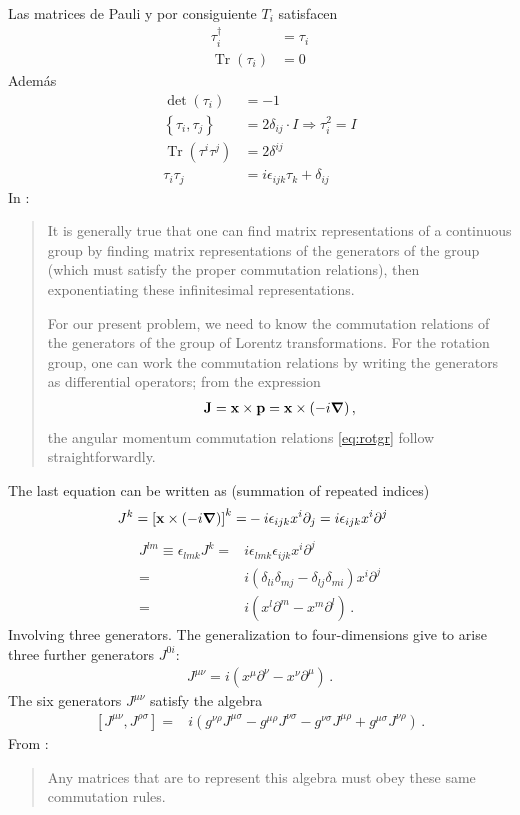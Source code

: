 Las matrices de Pauli y por consiguiente $T_i$ satisfacen 
\begin{align}
  \tau_i^\dagger&=\tau_i\nonumber\\
  \operatorname{Tr}  \left(
    \tau_i
  \right)&=0
\end{align}
Además
\begin{align}
  \label{eq:64qft}
  \det
  \left(
    \tau_i
  \right)&=-1\nonumber\\
  \left\{ 
    \tau_i,\tau_j
  \right\}&=2\delta_{ij}\cdot I\Rightarrow\tau_i^2=I\nonumber \\
\operatorname{Tr} \left(\tau^i\tau^j\right)&=2\delta^{ij}\nonumber\\
\tau_i\tau_j&=i\epsilon_{ijk}\tau_k+\delta_{ij}
\end{align}
In \cite{Peskin}:
\begin{quote}
  It is generally true that one can find matrix representations of a continuous group by finding matrix representations of the generators of the group (which must satisfy the proper commutation relations), then exponentiating these infinitesimal representations. 

For our present problem, we need to know the commutation relations of the generators of the group of Lorentz transformations. For the rotation group, one can work the commutation relations by writing the generators as differential operators; from the expression
\begin{align}
  \mathbf{J}=\mathbf{x}\times \mathbf{p}=\mathbf{x}\times (-i\boldsymbol{\nabla})\,,
\end{align}
the angular momentum commutation relations \eqref{eq:rotgr} follow straightforwardly. 
\end{quote}
The last equation can be written as (summation of repeated indices)
\begin{align}
  J^k=\left[\mathbf{x}\times (-i\boldsymbol{\nabla})\right]^k=&
-i\epsilon_{ijk}x^i\partial_j=i\epsilon_{ijk}x^i\partial^j
\end{align}
\begin{align}
  J^{l m}\equiv\epsilon_{lmk}J^k=&i\epsilon_{lmk}\epsilon_{ijk}x^i\partial^j\nonumber\\
=&i(\delta_{li}\delta_{mj}-\delta_{lj}\delta_{mi})x^i\partial^j\nonumber\\
=&i(x^l\partial^m-x^m\partial^l)\,.
\end{align}
Involving three generators. The generalization to four-dimensions give to arise three further generators $J^{0i}$:
\begin{align}
  J^{\mu\nu}=i(x^\mu\partial^\nu-x^\nu\partial^\mu)\,.
\end{align}
The six generators $J^{\mu\nu}$ satisfy the algebra
\begin{align}
\label{eq:lrtalg}
  \left[J^{\mu\nu},J^{\rho\sigma}\right]=&
i(g^{\nu\rho}J^{\mu\sigma}-g^{\mu\rho}J^{\nu\sigma}-g^{\nu\sigma}J^{\mu\rho}+g^{\mu\sigma}J^{\nu\rho})\,.
\end{align}
From \cite{Peskin}:
\begin{quote}
  Any matrices that are to represent this algebra must obey these same commutation rules. 
\end{quote}

